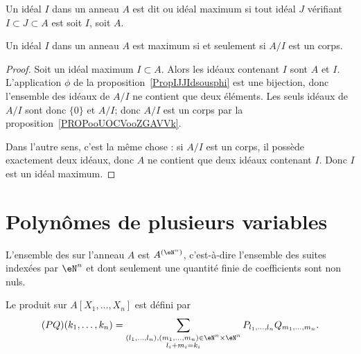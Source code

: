 \begin{definition}\label{DEFIdealMax}
	Un idéal \( I\) dans un anneau \( A \) est dit  ou idéal maximum si tout idéal \( J \) vérifiant \( I \subset J \subset A \) est soit \( I \), soit \( A \).
\end{definition}

\begin{proposition}     \label{PROPooSHHWooCyZPPw}
	Un idéal \( I\) dans un anneau \( A \) est maximum si et seulement si \( A/I\) est un corps.
\end{proposition}

\begin{proof}
	Soit un idéal maximum \( I\subset A\). Alors les idéaux contenant \( I\) sont \( A\) et \( I\). L'application \( \phi\) de la proposition~\ref{PropIJJIdsousphi} est une bijection, donc l'ensemble des idéaux de \( A/I\) ne contient que deux éléments. Les seuls idéaux de \( A/I\) sont donc \( \{ 0 \}\) et \( A/I\); donc \( A/I\) est un corps par la proposition~\ref{PROPooUOCVooZGAVVk}.

	Dans l'autre sens, c'est la même chose : si \( A/I\) est un corps, il possède exactement deux idéaux, donc \( A\) ne contient que deux idéaux contenant \( I\). Donc \( I\) est un idéal maximum.
\end{proof}

\section{Polynômes de plusieurs variables}

\begin{definition}      \label{DEFooZNHOooCruuwI}
	L'ensemble des  sur l'anneau \( A\) est \( A^{(\eN^n)}\), c'est-à-dire l'ensemble des suites indexées par \( \eN^n\) et dont seulement une quantité finie de coefficients sont non nuls.

	Le produit sur \( A[X_1,\ldots, X_n]\) est défini par
	\begin{equation}
		(PQ)(k_1,\ldots, k_n)=\sum_{\substack{ (l_1,\ldots, l_n),(m_1,\ldots, m_n)\in \eN^n\times \eN^n   \\l_i+m_i=k_i}}P_{l_1,\ldots, l_n}Q_{m_1,\ldots, m_n}.
	\end{equation}
\end{definition}

